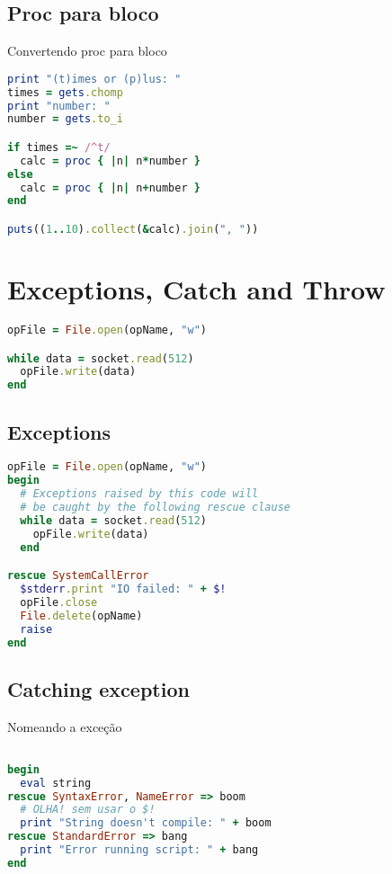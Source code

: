 \documentclass[serif,mathserif]{book}
\begin{document}
\section{Proc para bloco}

Convertendo proc para bloco

\begin{lstlisting}[language=ruby]
print "(t)imes or (p)lus: "
times = gets.chomp
print "number: "
number = gets.to_i

if times =~ /^t/
  calc = proc { |n| n*number }
else
  calc = proc { |n| n+number }
end

puts((1..10).collect(&calc).join(", "))
\end{lstlisting}

\chapter{Exceptions, Catch and Throw}

\begin{lstlisting}[language=ruby]
opFile = File.open(opName, "w")

while data = socket.read(512)
  opFile.write(data)
end
\end{lstlisting}

\section{Exceptions}

\begin{lstlisting}[language=ruby]
opFile = File.open(opName, "w")
begin
  # Exceptions raised by this code will
  # be caught by the following rescue clause
  while data = socket.read(512)
    opFile.write(data)
  end

rescue SystemCallError
  $stderr.print "IO failed: " + $!
  opFile.close
  File.delete(opName)
  raise
end
\end{lstlisting}

\section{Catching exception}

Nomeando a exceção

\begin{lstlisting}[language=ruby]

begin
  eval string
rescue SyntaxError, NameError => boom
  # OLHA! sem usar o $!
  print "String doesn't compile: " + boom
rescue StandardError => bang
  print "Error running script: " + bang
end
\end{lstlisting}
\end{document}
